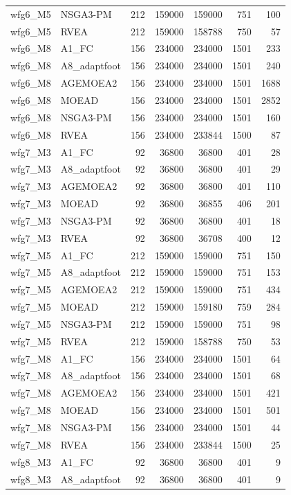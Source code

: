 \begin{tabular}{llrrrrr}
wfg6_M5 & NSGA3-PM & 212 & 159000 & 159000 & 751 & 100 \\
wfg6_M5 & RVEA & 212 & 159000 & 158788 & 750 & 57 \\
wfg6_M8 & A1_FC & 156 & 234000 & 234000 & 1501 & 233 \\
wfg6_M8 & A8_adaptfoot & 156 & 234000 & 234000 & 1501 & 240 \\
wfg6_M8 & AGEMOEA2 & 156 & 234000 & 234000 & 1501 & 1688 \\
wfg6_M8 & MOEAD & 156 & 234000 & 234000 & 1501 & 2852 \\
wfg6_M8 & NSGA3-PM & 156 & 234000 & 234000 & 1501 & 160 \\
wfg6_M8 & RVEA & 156 & 234000 & 233844 & 1500 & 87 \\
wfg7_M3 & A1_FC & 92 & 36800 & 36800 & 401 & 28 \\
wfg7_M3 & A8_adaptfoot & 92 & 36800 & 36800 & 401 & 29 \\
wfg7_M3 & AGEMOEA2 & 92 & 36800 & 36800 & 401 & 110 \\
wfg7_M3 & MOEAD & 92 & 36800 & 36855 & 406 & 201 \\
wfg7_M3 & NSGA3-PM & 92 & 36800 & 36800 & 401 & 18 \\
wfg7_M3 & RVEA & 92 & 36800 & 36708 & 400 & 12 \\
wfg7_M5 & A1_FC & 212 & 159000 & 159000 & 751 & 150 \\
wfg7_M5 & A8_adaptfoot & 212 & 159000 & 159000 & 751 & 153 \\
wfg7_M5 & AGEMOEA2 & 212 & 159000 & 159000 & 751 & 434 \\
wfg7_M5 & MOEAD & 212 & 159000 & 159180 & 759 & 284 \\
wfg7_M5 & NSGA3-PM & 212 & 159000 & 159000 & 751 & 98 \\
wfg7_M5 & RVEA & 212 & 159000 & 158788 & 750 & 53 \\
wfg7_M8 & A1_FC & 156 & 234000 & 234000 & 1501 & 64 \\
wfg7_M8 & A8_adaptfoot & 156 & 234000 & 234000 & 1501 & 68 \\
wfg7_M8 & AGEMOEA2 & 156 & 234000 & 234000 & 1501 & 421 \\
wfg7_M8 & MOEAD & 156 & 234000 & 234000 & 1501 & 501 \\
wfg7_M8 & NSGA3-PM & 156 & 234000 & 234000 & 1501 & 44 \\
wfg7_M8 & RVEA & 156 & 234000 & 233844 & 1500 & 25 \\
wfg8_M3 & A1_FC & 92 & 36800 & 36800 & 401 & 9 \\
wfg8_M3 & A8_adaptfoot & 92 & 36800 & 36800 & 401 & 9 \\

\end{tabular}
